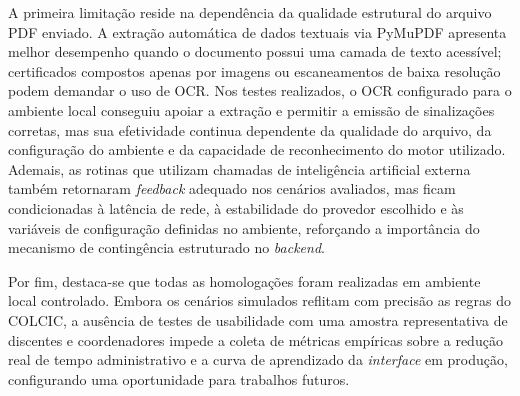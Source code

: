 A primeira limitação reside na dependência da qualidade estrutural do arquivo PDF enviado. A extração automática de dados textuais via PyMuPDF apresenta melhor desempenho quando o documento possui uma camada de texto acessível; certificados compostos apenas por imagens ou escaneamentos de baixa resolução podem demandar o uso de OCR. Nos testes realizados, o OCR configurado para o ambiente local conseguiu apoiar a extração e permitir a emissão de sinalizações corretas, mas sua efetividade continua dependente da qualidade do arquivo, da configuração do ambiente e da capacidade de reconhecimento do motor utilizado. Ademais, as rotinas que utilizam chamadas de inteligência artificial externa também retornaram \textit{feedback} adequado nos cenários avaliados, mas ficam condicionadas à latência de rede, à estabilidade do provedor escolhido e às variáveis de configuração definidas no ambiente, reforçando a importância do mecanismo de contingência estruturado no \textit{backend}.

Por fim, destaca-se que todas as homologações foram realizadas em ambiente local controlado. Embora os cenários simulados reflitam com precisão as regras do COLCIC, a ausência de testes de usabilidade com uma amostra representativa de discentes e coordenadores impede a coleta de métricas empíricas sobre a redução real de tempo administrativo e a curva de aprendizado da \textit{interface} em produção, configurando uma oportunidade para trabalhos futuros.
